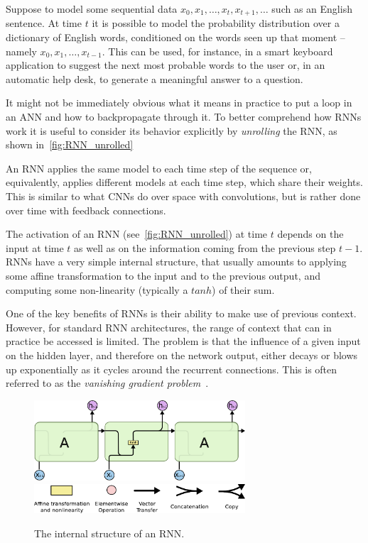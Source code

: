 Suppose to model some sequential data $x_0, x_1, \dots , x_t, x_{t+1}, \dots$ such as an English sentence. At time $t$ it is possible to model the probability distribution over a dictionary of English words, conditioned on the words seen up that moment -- namely $x_0, x_1, \dots , x_{t-1}$. This can be used, for instance, in a smart keyboard application to suggest the next most probable words to the user or, in an automatic help desk, to generate a meaningful answer to a question.

It might not be immediately obvious what it means in practice to put a loop in an ANN and how to backpropagate through it. To better comprehend how RNNs work it is useful to consider its behavior explicitly by \emph{unrolling} the RNN, as shown in~\ref{fig:RNN_unrolled}

An RNN applies the same model to each time step of the sequence or, equivalently, applies different models at each time step, which share their weights. This is similar to what CNNs do over space with convolutions, but is rather done over time with feedback connections.

The activation of an RNN (see~\ref{fig:RNN_unrolled}) at time $t$ depends on the input at time $t$ as well as on the information coming from the previous step $t-1$. RNNs have a very simple internal structure, that usually amounts to applying some affine transformation to the input and to the previous output, and computing some non-linearity (typically a $tanh$) of their sum.

One of the key benefits of RNNs is their ability to make use of previous context.   However,  for standard RNN architectures, the range of context that can in practice be accessed is limited.  The problem is that the influence of a given input on the hidden layer,  and therefore on the network output, either decays or blows up exponentially as it cycles around the recurrent connections.  This is often referred to as the \textit{vanishing gradient problem}~\cite{Hochreiter_01}. 

\begin{figure}[t]
	\centering
	\includegraphics[width=0.7\textwidth]{figures/RNN_internals.pdf}
	\includegraphics[width=0.7\textwidth]{figures/LSTM_notation.pdf}
	\caption{The internal structure of an RNN.\label{fig:RNN_internals}}
\end{figure}

